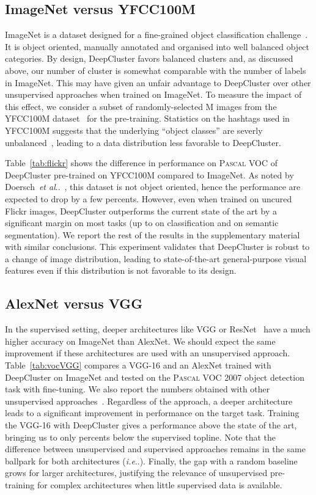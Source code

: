 \documentclass[runningheads]{llncs}
\makeatletter
\DeclareRobustCommand\onedot{\futurelet\@let@token\@onedot}
\def\@onedot{\ifx\@let@token.\else.\null\fi\xspace}
\def\ie{\emph{i.e}\onedot} \def\Ie{\emph{I.e}\onedot}
\def\etal{\emph{et al}\onedot}
\def\OURS{DeepCluster\xspace}
\makeatother
\begin{document}
\subsection{ImageNet versus YFCC100M}

ImageNet is a dataset designed for a fine-grained object classification challenge~\cite{russakovsky2015imagenet}.
It is object oriented, manually annotated and organised into well balanced object categories.
By design, \OURS favors balanced clusters and, as discussed above, our number of cluster  is somewhat comparable with the number of labels in ImageNet.
This may have given an unfair advantage to \OURS over other unsupervised approaches when trained on ImageNet.
To measure the impact of this effect, we consider a subset of randomly-selected M images from the YFCC100M dataset~\cite{thomee2015new} for the pre-training.
Statistics on the hashtags used in YFCC100M suggests that the underlying ``object classes'' are severly unbalanced~\cite{joulin2016learning},
leading to a data distribution less favorable to \OURS.

Table~\ref{tab:flickr} shows the difference in performance on \textsc{Pascal} VOC of \OURS pre-trained on YFCC100M compared to ImageNet.
As noted by Doersch~\etal~\cite{doersch2015unsupervised}, this dataset is not object oriented, hence the performance are expected to drop by a few percents.
However, even when trained on uncured Flickr images, \OURS outperforms the current state of the art by a significant margin on most tasks (up to  on classification and  on semantic segmentation).
We report the rest of the results in the supplementary material with similar conclusions.
This experiment validates that \OURS is robust to a change of image distribution, leading
to state-of-the-art general-purpose visual features even if this distribution is not favorable to its design.

\subsection{AlexNet versus VGG}

In the supervised setting, deeper architectures like VGG or ResNet~\cite{he2015delving} have a much higher accuracy on ImageNet than AlexNet.
We should expect the same improvement if these architectures are used with an unsupervised approach.
Table~\ref{tab:vocVGG} compares a VGG-16 and an AlexNet trained with \OURS on ImageNet and tested on the \textsc{Pascal} VOC 2007 object detection task with fine-tuning.
We also report the numbers obtained with other unsupervised approaches~\cite{doersch2015unsupervised,wang2017transitive}.
Regardless of the approach, a deeper architecture leads to a significant improvement in performance on the target task.
Training the VGG-16 with \OURS gives a performance above the state of the art, bringing us to only  percents below the supervised topline.
Note that the difference between unsupervised and supervised approaches remains in the same ballpark for both architectures (\ie ).
Finally, the gap with a random baseline grows for larger architectures,
justifying the relevance of unsupervised pre-training for complex architectures when little supervised data is available.
\end{document}
